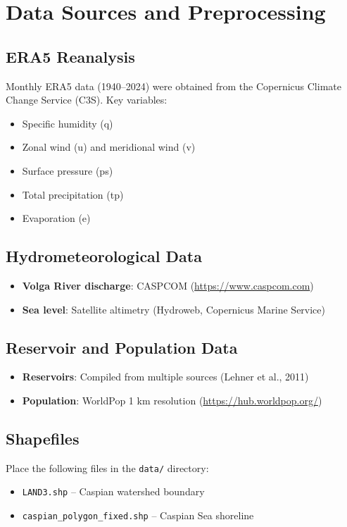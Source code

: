 \documentclass[12pt,a4paper]{article}
\begin{document}
\section{Data Sources and Preprocessing}

\subsection{ERA5 Reanalysis}
Monthly ERA5 data (1940–2024) were obtained from the Copernicus Climate Change Service (C3S). Key variables:
\begin{itemize}
    \item Specific humidity (q)
    \item Zonal wind (u) and meridional wind (v)
    \item Surface pressure (ps)
    \item Total precipitation (tp)
    \item Evaporation (e)
\end{itemize}

\subsection{Hydrometeorological Data}
\begin{itemize}
    \item \textbf{Volga River discharge}: CASPCOM (\url{https://www.caspcom.com})
    \item \textbf{Sea level}: Satellite altimetry (Hydroweb, Copernicus Marine Service)
\end{itemize}

\subsection{Reservoir and Population Data}
\begin{itemize}
    \item \textbf{Reservoirs}: Compiled from multiple sources (Lehner et al., 2011)
    \item \textbf{Population}: WorldPop 1 km resolution (\url{https://hub.worldpop.org/})
\end{itemize}

\subsection{Shapefiles}
Place the following files in the \texttt{data/} directory:
\begin{itemize}
    \item \texttt{LAND3.shp} – Caspian watershed boundary
    \item \texttt{caspian\_polygon\_fixed.shp} – Caspian Sea shoreline
\end{itemize}
\end{document}
